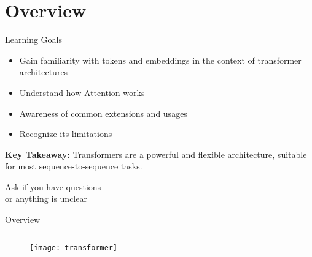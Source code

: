 \section{Overview}

\begin{frame}[c]{Learning Goals} 
    \large
    \begin{itemize}[<+(1)->]
        \item Gain familiarity with tokens and embeddings in the context of
            transformer architectures
        \item Understand how Attention works
        \item Awareness of common extensions and usages
        \item Recognize its limitations
    \end{itemize}
    \pause
    \textbf{Key Takeaway:} Transformers are a powerful and flexible
    architecture, suitable for most sequence-to-sequence tasks.
\end{frame}

\addtocounter{framenumber}{1}
\begin{frame}[standout]
    \huge
    Ask if you have questions \\
    or anything is unclear
\end{frame}

\begin{frame}[c]{Overview}
    \begin{figure}
        \begin{columns}
            \texttt{[image: transformer]}
        \end{columns}
    \end{figure}
\end{frame}
